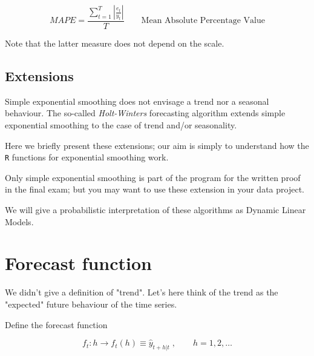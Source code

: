\documentclass[dvipsnames,12pt]{book}
\begin{document}
                \begin{equation}
                    MAPE =  \frac{\sum_{t=1}^T | \frac{e_t}{y_t} |}{T}  \quad \quad \mbox{Mean  Absolute Percentage Value}
                \end{equation}

                Note that the latter measure does not depend on the scale.

            \subsection{Extensions}

                Simple exponential smoothing does not envisage a trend nor a seasonal behaviour. The so-called \textit{Holt-Winters} forecasting algorithm extends simple exponential smoothing to the case of trend and/or seasonality. 

                \noindent Here we briefly present these extensions; our aim is simply to understand how the \texttt{R} functions for exponential smoothing work.

                \noindent Only simple exponential smoothing is part of the program for the written proof in the final exam; but you may want to use these extension in your data project.

                \begin{remark}
                    We will give a probabilistic interpretation of these algorithms  as Dynamic Linear Models. 
                \end{remark}

        \section{Forecast function}

            We didn't give a definition of "trend". Let's here think of the trend as the "expected" future behaviour of the time series.  

            \begin{definition}
                Define the forecast function

                \begin{equation}
                    f_t : h \rightarrow f_t(h) \equiv \hat{y}_{t+h | t} \; , \quad \quad h=1, 2, \ldots
                \end{equation}
                
            \end{definition}
\end{document}
